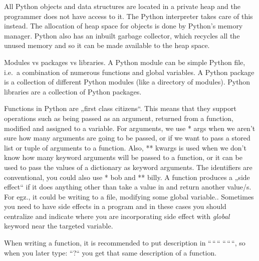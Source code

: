 \documentclass[
  letterpaper,
  DIV=11,
  numbers=noendperiod]{scrreprt}
\begin{document}
All Python objects and data structures are located in a private heap and
the programmer does not have access to it. The Python interpreter takes
care of this instead. The allocation of heap space for objects is done
by Python's memory manager. Python also has an inbuilt garbage
collector, which recycles all the unused memory and so it can be made
available to the heap space.

Modules vs packages vs libraries. A Python module can be simple Python
file, i.e.~a combination of numerous functions and global variables. A
Python package is a collection of different Python modules (like a
directory of modules). Python libraries are a collection of Python
packages.

Functions in Python are „first class citizens``. This means that they
support operations such as being passed as an argument, returned from a
function, modified and assigned to a variable. For arguments, we use *
args when we aren't sure how many arguments are going to be passed, or
if we want to pass a stored list or tuple of arguments to a function.
Also, ** kwargs is used when we don't know how many keyword arguments
will be passed to a function, or it can be used to pass the values of a
dictionary as keyword arguments. The identifiers are conventional, you
could also use * bob and ** billy. A function produces a „side effect``
if it does anything other than take a value in and return another
value/s. For egz., it could be writing to a file, modifying some global
variable.. Sometimes you need to have side effects in a program and in
these cases you should centralize and indicate where you are
incorporating side effect with \emph{global} keyword near the targeted
variable.

\begin{tcolorbox}[enhanced jigsaw, opacitybacktitle=0.6, colback=white, bottomrule=.15mm, coltitle=black, opacityback=0, breakable, rightrule=.15mm, colframe=quarto-callout-tip-color-frame, arc=.35mm, titlerule=0mm, colbacktitle=quarto-callout-tip-color!10!white, toptitle=1mm, bottomtitle=1mm, leftrule=.75mm, toprule=.15mm, title=\textcolor{quarto-callout-tip-color}{\faLightbulb}\hspace{0.5em}{Tip}, left=2mm]

When writing a function, it is recommended to put description in
``\,``\,`` ``\,``\,``, so when you later type: ``?{}`` you get that same
description of a function.

\end{tcolorbox}
\end{document}
